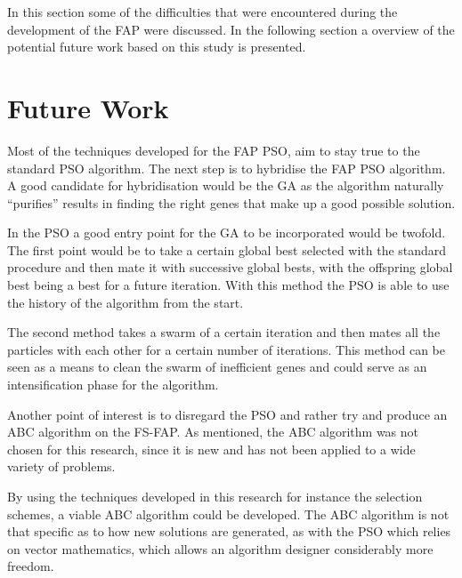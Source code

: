 In this section some of the difficulties that were encountered during the development of the FAP were discussed. In the following section a overview of the potential future work based on this study is presented.
\section{Future Work}
Most of the techniques developed for the FAP PSO, aim to stay true to the standard PSO algorithm. The next step is to hybridise the FAP PSO algorithm. A good candidate for hybridisation would be the GA as the algorithm naturally ``purifies'' results in finding the right genes that make up a good possible solution.

In the PSO a good entry point for the GA to be incorporated would be twofold. The first point would be to take a certain global best selected with the standard procedure and then mate it with successive global bests, with the offspring global best being a best for a future iteration. With this method the PSO is able to use the history of the algorithm from the start.

The second method takes a swarm of a certain iteration and then mates all the particles with each other for a certain number of iterations. This method can be seen as a means to clean the swarm of inefficient genes and could serve as an intensification phase for the algorithm.

Another point of interest is to disregard the PSO and rather try and produce an ABC algorithm on the FS-FAP. As mentioned, the ABC algorithm was not chosen for this research, since it is new and has not been applied to a wide variety of problems. 

By using the techniques developed in this research for instance the selection schemes, a viable ABC algorithm could be developed. The ABC algorithm is not that specific as to how new solutions are generated, as with the PSO which relies on vector mathematics, which allows an algorithm designer considerably more freedom.





